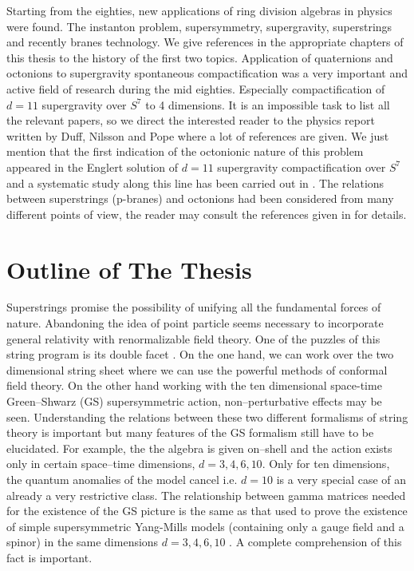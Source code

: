 \documentclass[a4paper,12pt]{book}
\begin{document}
Starting from the eighties, new applications of ring division algebras in
physics were found. The instanton problem, supersymmetry, supergravity,
superstrings and recently branes technology. We give references in the
appropriate chapters of this thesis to the history of the first two topics.
Application of quaternions and octonions to supergravity spontaneous
compactification was a very important and active field of research during
the mid eighties. Especially compactification of $d=11$ supergravity over $%
S^{7}$ to 4 dimensions. It is an impossible task to list all the relevant
papers, so we direct the interested reader to the physics report \cite
{duffpope} written by Duff, Nilsson and Pope where a lot of references are
given. We just mention that the first indication of the octonionic nature of
this problem appeared in the Englert solution of $d=11$ supergravity
compactification over $S^{7}$\cite{englert} and a systematic study along
this line has been carried out in \cite{rom}\cite{grutze}\cite{tukersudbery}%
\cite{dewittnicol}. The relations between superstrings (p-branes) and
octonions had been considered from many different points of view, the reader
may consult the references given in \cite{duff} for details.\newpage

\section{Outline of The Thesis}

Superstrings promise the possibility of unifying all the fundamental forces
of nature. Abandoning the idea of point particle seems necessary to
incorporate general relativity with renormalizable field theory. One of the
puzzles of this string program is its double facet \cite{gsw}\cite{polsh}.
On the one hand, we can work over the two dimensional string sheet where we
can use the powerful methods of conformal field theory. On the other hand
working with the ten dimensional space-time Green--Shwarz (GS)
supersymmetric action, non--perturbative effects may be seen. Understanding
the relations between these two different formalisms of string theory is
important but many features of the GS formalism still have to be elucidated.
For example, the the algebra is given on--shell and the action exists only
in certain space--time dimensions, $d=3,4,6,10$. Only for ten dimensions,
the quantum anomalies of the model cancel i.e. $d=10$ is a very special case
of an already a very restrictive class. The relationship between gamma
matrices needed for the existence of the GS picture is the same as that used
to prove the existence of simple supersymmetric Yang-Mills models
(containing only a gauge field and a spinor) in the same dimensions $%
d=3,4,6,10$ \cite{r0}. A complete comprehension of this fact is important.
\end{document}
